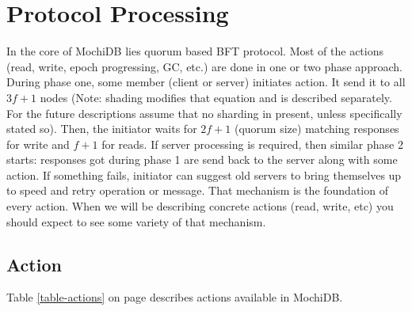 \documentclass[letterpaper,twocolumn,10pt]{article}
\begin{document}
\section{Protocol Processing}
In the core of MochiDB lies quorum based BFT protocol. Most of the actions (read, write, epoch progressing, GC, etc.) are done in one or two phase approach. During phase one, some member (client or server) initiates action. It send it to all $3f+1$ nodes (Note: shading modifies that equation and is described separately. For the future descriptions assume that no sharding in present, unless specifically stated so). Then, the initiator waits for $2f+1$ (quorum size) matching responses for write and $f+1$ for reads. If server processing is required, then similar phase 2 starts: responses got during phase 1 are send back to the server along with some action. If something fails, initiator can suggest old servers to bring themselves up to speed and retry operation or message.
That mechanism is the foundation of every action. When we will be describing concrete actions (read, write, etc) you should expect to see some variety of that mechanism.

\subsection{Action}

Table \ref{table-actions} on page \pageref{table-actions} describes actions available in MochiDB.

\begin{table}[]
\centering
\caption{MochiDB actions}
\label{table-actions}
\end{table}
\end{document}
